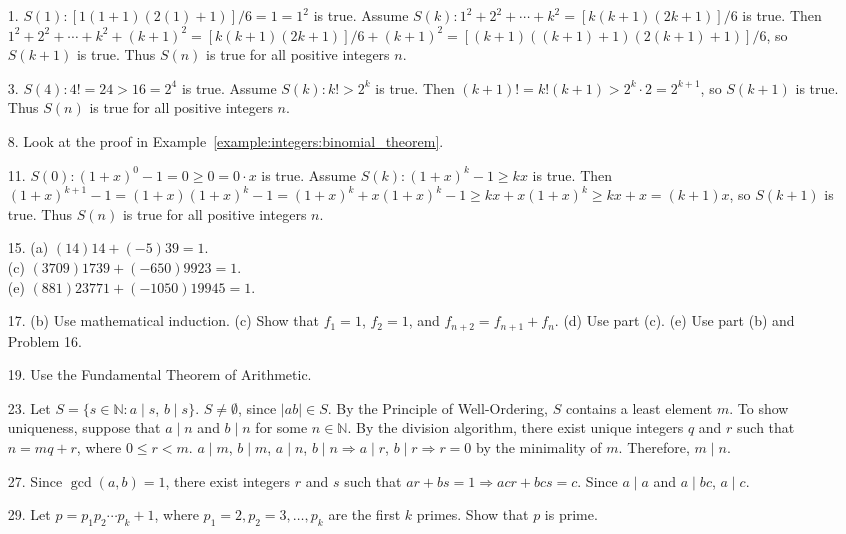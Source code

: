  
{\small
\begin{itemize}
 
 
\item[1.]
$S(1): [1(1+1)(2(1) + 1)]/6 = 1 = 1^2$ is true. Assume $S(k): 1^2 +2^2
+ \cdots + k^2 = [k(k+1)(2k+1)]/6$ is true. Then $1^2 + 2^2 + \cdots +
k^2 + (k+1)^2 = [k(k+1)(2k+1)]/6 + (k+1)^2 = [(k+1)((k+1) +1)(2(k+1) +
1)]/6$, so $S(k+1)$ is true. Thus $S(n)$ is true for all positive
integers $n$. 
 
\item[3.]
$S(4): 4! = 24 > 16 =2^4$ is true. Assume $S(k): k! >2^k$ is true.
Then $(k+1)! = k! (k+1) > 2^k \cdot 2 = 2^{k+1}$, so $S(k+1)$ is true.
Thus $S(n)$ is true for all positive integers $n$. 
 
 
\item[8.]
Look at the proof in Example~\ref{example:integers:binomial_theorem}.
 
\item[11.]
$S(0): (1+x)^0 -1 = 0 \geq 0 = 0 \cdot x$ is true. Assume $S(k):
(1+x)^k -1 \geq kx$ is true. Then $(1+x)^{k+1} - 1 = (1+x)(1+x)^k -1 =
(1+x)^k + x(1+x)^k -1 \geq kx + x(1+x)^k \geq kx + x = (k+1)x$, so
$S(k+1)$ is true. Thus $S(n)$ is true for all positive integers $n$.
 
 
\item[15.]
(a) $(14)14 + (-5)39 = 1$.\\
(c) $(3709) 1739 + (-650) 9923 = 1$.\\
(e) $(881) 23771 + (-1050) 19945 = 1$.
 
 
\item[17.]
(b) Use mathematical induction.
(c) Show that $f_1 = 1$, $f_2 = 1$, and $f_{n + 2}
= f_{n + 1} + f_n$.
(d) Use part (c).
(e) Use part (b) and Problem 16.
 
 
\item[19.]
Use the Fundamental Theorem of Arithmetic.
 
 
\item[23.]
Let $S = \{s \in {\mathbb N} : a \mid s$, $b \mid s \}$. $S \neq \emptyset$,
since $|ab| \in S$. By the Principle of Well-Ordering, $S$ contains a
least element $m$. To show uniqueness, suppose that $a \mid n$ and $b
\mid n$ for some $n \in {\mathbb N}$. By the division algorithm, there
exist unique integers $q$ and $r$ such that $n = mq + r$, where $0
\leq r < m$. $a \mid m$, $b \mid m$, $a \mid n$, $b \mid n \Rightarrow a
\mid r$, $b \mid r \Rightarrow r = 0$ by the minimality of $m$.
Therefore, $m \mid n$. 
 
 
\item[27.]
Since $\gcd(a,b)=1$, there exist integers $r$ and $s$ such that $ar +
bs =1 \Rightarrow acr+bcs =c$. Since $a \mid a$ and $a \mid bc$, $a
\mid c$.
 
 
\item[29.]
Let $p = p_1 p_2 \cdots p_k + 1$, where $p_1 = 2, p_2 = 3, \ldots,
p_k$ are the first $k$ primes.  Show that $p$ is prime.
 
\end{itemize}
}
 
